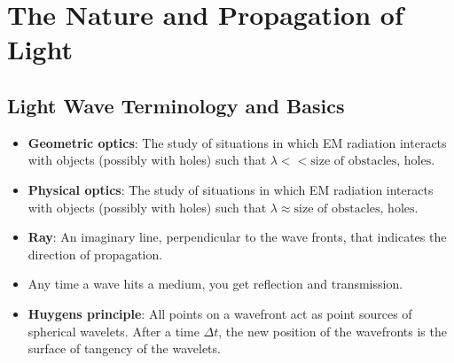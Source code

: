 \documentclass[../notes.tex]{subfiles}
\begin{document}
\chapter{The Nature and Propagation of Light}
\section{Light Wave Terminology and Basics}
\begin{itemize}
    \item {}\textbf{Geometric optics}: The study of situations in which EM radiation interacts with objects (possibly with holes) such that $\lambda<<\text{size of obstacles, holes}$.
    \item \textbf{Physical optics}: The study of situations in which EM radiation interacts with objects (possibly with holes) such that $\lambda\approx\text{size of obstacles, holes}$.
    \item \textbf{Ray}: An imaginary line, perpendicular to the wave fronts, that indicates the direction of propagation.
    \item Any time a wave hits a medium, you get reflection and transmission.
    \item \textbf{Huygens principle}: All points on a wavefront act as point sources of spherical wavelets. After a time $\Delta t$, the new position of the wavefronts is the surface of tangency of the wavelets.
    \begin{figure}[h!]
        \centering
\end{figure}
\end{itemize}
\end{document}
